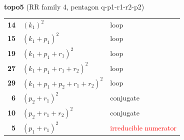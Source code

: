 \documentclass[10pt]{article}
\begin{document}
\begin{minipage}[t]{0.48\textwidth}
{}\\[2mm]\textbf{topo5} (RR family 4, pentagon q-p1-r1-r2-p2)\\[2pt]{\footnotesize\begin{tabular}{@{}r@{\ \ }l@{\ \ }l@{}}\textbf{14} & $(k_1)^2$ & loop\\
\textbf{15} & $(k_1+p_1)^2$ & loop\\
\textbf{19} & $(k_1+p_1+r_1)^2$ & loop\\
\textbf{27} & $(k_1+p_1+r_1+r_2)^2$ & loop\\
\textbf{29} & $(k_1+p_1+p_2+r_1+r_2)^2$ & loop\\
\textbf{6} & $(p_2+r_1)^2$ & conjugate\\
\textbf{10} & $(p_2+r_1+r_2)^2$ & conjugate\\
\textbf{5} & $(p_1+r_1)^2$ & \textcolor{red}{irreducible numerator}\\\end{tabular}}\end{minipage}\hfill%
\end{document}
